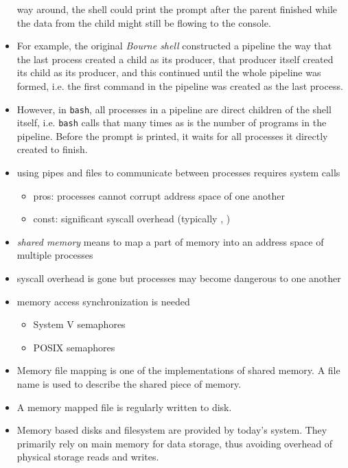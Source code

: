 \begin{itemize}
way around, the shell could print the prompt after the parent finished while the
data from the child might still be flowing to the console.
\item For example, the original \emph{Bourne shell} constructed a pipeline the
way that the last process created a child as its producer, that producer itself
created its child as its producer, and this continued until the whole pipeline
was formed, i.e. the first command in the pipeline was created as the last
process.
\item However, in \texttt{bash}, all processes in a pipeline are direct children
of the shell itself, i.e. \texttt{bash} calls  that many times as is
the number of programs in the pipeline.  Before the prompt is printed, it waits
for all processes it directly created to finish.
\end{itemize}


\begin{slide}
\begin{itemize}
\item using pipes and files to communicate between processes requires system
calls
\begin{itemize}
\item pros: processes cannot corrupt address space of one another
\item const: significant syscall overhead (typically ,
)
\end{itemize}
\item \emph{shared memory} means to map a part of memory into an address space
of multiple processes
\item syscall overhead is gone but processes may become dangerous to one another
\item memory access synchronization is needed
\begin{itemize}
  \item System V semaphores
  \item POSIX semaphores
\end{itemize}
\end{itemize}
\end{slide}

\begin{itemize}
\item Memory file mapping is one of the implementations of shared memory.  A
file name is used to describe the shared piece of memory.
\item A memory mapped file is regularly written to disk.
\item Memory based disks and filesystem are provided by today's system.  They
primarily rely on main memory for data storage, thus avoiding overhead of
physical storage reads and writes.
\end{itemize}

